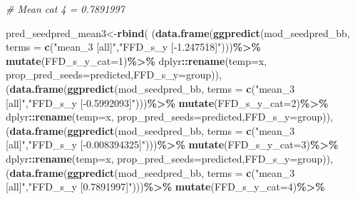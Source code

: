 \documentclass[
]{article}
\newenvironment{Shaded}{\begin{snugshade}}{\end{snugshade}}
\newcommand{\CommentTok}[1]{\textcolor[rgb]{0.56,0.35,0.01}{\textit{#1}}}
\newcommand{\DataTypeTok}[1]{\textcolor[rgb]{0.13,0.29,0.53}{#1}}
\newcommand{\DecValTok}[1]{\textcolor[rgb]{0.00,0.00,0.81}{#1}}
\newcommand{\KeywordTok}[1]{\textcolor[rgb]{0.13,0.29,0.53}{\textbf{#1}}}
\newcommand{\NormalTok}[1]{#1}
\newcommand{\OperatorTok}[1]{\textcolor[rgb]{0.81,0.36,0.00}{\textbf{#1}}}
\newcommand{\StringTok}[1]{\textcolor[rgb]{0.31,0.60,0.02}{#1}}
\begin{document}
\begin{Shaded}
\begin{Highlighting}[]
\CommentTok{\# Mean cat 4 = 0.7891997}

\NormalTok{pred\_seedpred\_mean3\textless{}{-}}\KeywordTok{rbind}\NormalTok{(}
\NormalTok{  (}\KeywordTok{data.frame}\NormalTok{(}\KeywordTok{ggpredict}\NormalTok{(mod\_seedpred\_bb,}
                        \DataTypeTok{terms =} \KeywordTok{c}\NormalTok{(}\StringTok{"mean\_3 [all]"}\NormalTok{,}\StringTok{"FFD\_s\_y [{-}1.247518]"}\NormalTok{)))}\OperatorTok{\%\textgreater{}\%}
\StringTok{     }\KeywordTok{mutate}\NormalTok{(}\DataTypeTok{FFD\_s\_y\_cat=}\DecValTok{1}\NormalTok{)}\OperatorTok{\%\textgreater{}\%}
\StringTok{     }\NormalTok{dplyr}\OperatorTok{::}\KeywordTok{rename}\NormalTok{(}\DataTypeTok{temp=}\NormalTok{x, }\DataTypeTok{prop\_pred\_seeds=}\NormalTok{predicted,}\DataTypeTok{FFD\_s\_y=}\NormalTok{group)),}
\NormalTok{  (}\KeywordTok{data.frame}\NormalTok{(}\KeywordTok{ggpredict}\NormalTok{(mod\_seedpred\_bb,}
                        \DataTypeTok{terms =} \KeywordTok{c}\NormalTok{(}\StringTok{"mean\_3 [all]"}\NormalTok{,}\StringTok{"FFD\_s\_y [{-}0.5992093]"}\NormalTok{)))}\OperatorTok{\%\textgreater{}\%}
\StringTok{     }\KeywordTok{mutate}\NormalTok{(}\DataTypeTok{FFD\_s\_y\_cat=}\DecValTok{2}\NormalTok{)}\OperatorTok{\%\textgreater{}\%}
\StringTok{     }\NormalTok{dplyr}\OperatorTok{::}\KeywordTok{rename}\NormalTok{(}\DataTypeTok{temp=}\NormalTok{x, }\DataTypeTok{prop\_pred\_seeds=}\NormalTok{predicted,}\DataTypeTok{FFD\_s\_y=}\NormalTok{group)),}
\NormalTok{  (}\KeywordTok{data.frame}\NormalTok{(}\KeywordTok{ggpredict}\NormalTok{(mod\_seedpred\_bb,}
                        \DataTypeTok{terms =} \KeywordTok{c}\NormalTok{(}\StringTok{"mean\_3 [all]"}\NormalTok{,}\StringTok{"FFD\_s\_y [{-}0.008394325]"}\NormalTok{)))}\OperatorTok{\%\textgreater{}\%}
\StringTok{     }\KeywordTok{mutate}\NormalTok{(}\DataTypeTok{FFD\_s\_y\_cat=}\DecValTok{3}\NormalTok{)}\OperatorTok{\%\textgreater{}\%}
\StringTok{     }\NormalTok{dplyr}\OperatorTok{::}\KeywordTok{rename}\NormalTok{(}\DataTypeTok{temp=}\NormalTok{x, }\DataTypeTok{prop\_pred\_seeds=}\NormalTok{predicted,}\DataTypeTok{FFD\_s\_y=}\NormalTok{group)),}
\NormalTok{  (}\KeywordTok{data.frame}\NormalTok{(}\KeywordTok{ggpredict}\NormalTok{(mod\_seedpred\_bb,}
                        \DataTypeTok{terms =} \KeywordTok{c}\NormalTok{(}\StringTok{"mean\_3 [all]"}\NormalTok{,}\StringTok{"FFD\_s\_y [0.7891997]"}\NormalTok{)))}\OperatorTok{\%\textgreater{}\%}
\StringTok{     }\KeywordTok{mutate}\NormalTok{(}\DataTypeTok{FFD\_s\_y\_cat=}\DecValTok{4}\NormalTok{)}\OperatorTok{\%\textgreater{}\%}

\end{Highlighting}
\end{Shaded}
\end{document}
